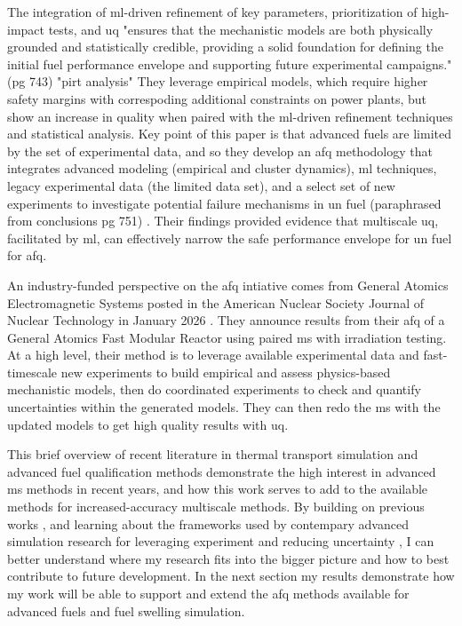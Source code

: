 The integration of \gls{ml}-driven refinement of key parameters, prioritization of high-impact tests, and \gls{uq} "ensures that the mechanistic models are both physically grounded and statistically credible, providing a solid foundation for defining the initial fuel performance envelope and supporting future experimental campaigns." (pg 743) "\gls{pirt} analysis"
They leverage empirical models, which require higher safety margins with correspoding additional constraints on power plants, but show an increase in quality when paired with the \gls{ml}-driven refinement techniques and statistical analysis. Key point of this paper is that advanced fuels are limited by the set of experimental data, and so they develop an \gls{afq} methodology that integrates advanced modeling (empirical and cluster dynamics), \gls{ml} techniques, legacy experimental data (the limited data set), and a select set of new experiments to investigate potential failure mechanisms in \gls{un} fuel (paraphrased from conclusions pg 751) \autocite{millerFirstResultsUranium2026}. Their findings provided evidence that multiscale \gls{uq}, facilitated by \gls{ml}, can effectively narrow the safe performance envelope for \gls{un} fuel for \gls{afq}.

An industry-funded perspective on the \gls{afq} intiative comes from General Atomics Electromagnetic Systems posted in the American Nuclear Society Journal of Nuclear Technology in January 2026 \autocite{choiAcceleratedFuelQualification2026}. They announce results from their \gls{afq} of a General Atomics Fast Modular Reactor using paired \gls{ms} with irradiation testing. At a high level, their method is to leverage available experimental data and fast-timescale new experiments to build empirical and assess physics-based mechanistic models, then do coordinated experiments to check and quantify uncertainties within the generated models. They can then redo the \gls{ms} with the updated models to get high quality results with \gls{uq}.

This brief overview of recent literature in thermal transport simulation and advanced fuel qualification methods demonstrate the high interest in advanced \gls{ms} methods in recent years, and how this work serves to add to the available methods for increased-accuracy multiscale methods. By building on previous works \autocite{hurleyThermalEnergyTransport2022,carbognoInitioGreenKuboApproach2017}, and learning about the frameworks used by contempary advanced simulation research for leveraging experiment and reducing uncertainty \autocite{matthewsMechanisticMultiscaleUncertainty2026,millerFirstResultsUranium2026,choiAcceleratedFuelQualification2026}, I can better understand where my research fits into the bigger picture and how to best contribute to future development.
In the next section my results demonstrate how my work will be able to support and extend the \gls{afq} methods available for advanced fuels and fuel swelling simulation.

\clearpage


